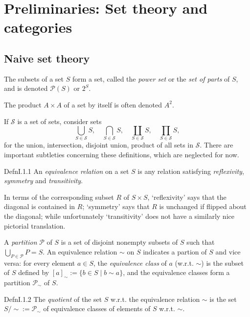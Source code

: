 \chapter{Preliminaries: Set theory and categories}

\section{Naive set theory}

The subsets of a set $S$ form a set, called the \textit{power set} or the \textit{set of parts} of $S$, and is denoted $\mathcal{P}(S)$ or $2^S$.

The product $A\times A$ of a set by itself is often denoted $A^2$.

If $\mathcal{S}$ is a set of sets, consider sets \[
  \bigcup_{S\in \mathcal{S}}S,\quad \bigcap_{S\in \mathcal{S}}S,\quad \coprod_{S\in \mathcal{S}}S,\quad \prod_{S\in \mathcal{S}}S,
\] for the union, intersection, disjoint union, product of all sets in $\mathcal{S}$. There are important subtleties concerning these definitions, which are neglected for now.


\begin{reference}{Defn}{I.1.1}
  An \textit{equivalence relation} on a set $S$ is any relation satisfying \textit{reflexivity}, \textit{symmetry} and \textit{transitivity}.
\end{reference}
In terms of the corresponding subset $R$ of $S\times S$, ‘reflexivity’ says that the diagonal is contained in $R$; ‘symmetry’ says that $R$ is unchanged if flipped about the diagonal; while unfortunately ‘transitivity’ does not have a similarly nice pictorial translation.

A \textit{partition} $\mathcal{P}$ of $S$ is a set of disjoint nonempty subsets of $S$ such that $\bigcup_{P\in \mathcal{P}}P=S$. An equivalence relation $\sim$ on $S$ indicates a partion of $S$ and vice versa: for every element $a\in S$, the \textit{equivalence class} of $a$ (w.r.t. $\sim$) is the subset of $S$ defined by $[a]_{\sim}:=\{b\in S\mid b\sim a\}$, and the equivalence classes form a partition $\mathcal{P}_{\sim}$ of $S$.

\begin{reference}{Defn}{I.1.2}
  The \textit{quotient} of the set $S$ w.r.t. the equivalence relation $\sim$ is the set $S/\sim:=\mathcal{P}_{\sim}$ of equivalence classes of elements of $S$ w.r.t. $\sim$.
\end{reference}


